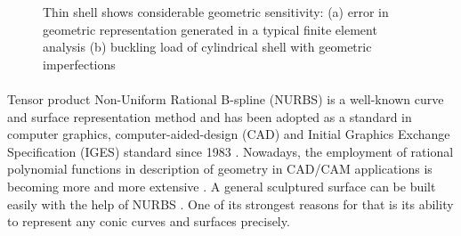 \begin{figure}
    \centering
    \caption[Thin shell shows considerable geometric sensitivity]{Thin shell shows considerable geometric sensitivity: (a) error in geometric representation generated in a typical finite element analysis \citep{Gee2005} (b) buckling load of cylindrical shell with geometric imperfections \citep{Sta1985}}
    \label{intro_fig:geolimit2}
\end{figure}
%
\paragraph{}
Tensor product Non-Uniform Rational B-spline (NURBS) is a well-known curve and surface representation method and has been adopted as a standard in computer graphics, computer-aided-design (CAD) \citep{Nas2003} and Initial Graphics Exchange Specification (IGES) standard since 1983 \citep{IGES1983}.
Nowadays, the employment of rational polynomial functions in description of geometry in CAD/CAM applications is becoming more and more extensive \citep{Pie1987}.
A general sculptured surface can be built easily with the help of NURBS \citep{Rog2001}.
One of its strongest reasons for that is its ability to represent any conic curves and surfaces precisely.

